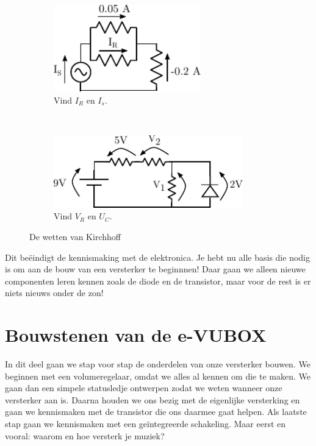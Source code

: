 \documentclass{article}
\begin{document}
			\begin{figure}[htbp]
				\centering
				\begin{subfigure}[b]{0.45\linewidth}
					\centering
					\includegraphics[width=0.7\textwidth]{kcl_oef.pdf}
					\caption{Vind $I_R$ en $I_s$.}
					\label{subfig:kcl_oef}
				\end{subfigure}
				~
				\begin{subfigure}[b]{0.45\linewidth}
					\centering
					\includegraphics[width=0.9\textwidth]{kvl_oef.pdf}
					\caption{Vind $V_R$ en $U_C$. }
					\label{subfig:kvl_oef}
				\end{subfigure}
			\caption{De wetten van Kirchhoff}
			\label{fig:kirchoff_oef}
			\end{figure}

			Dit be\"eindigt de kennismaking met de elektronica. Je hebt nu alle basis die nodig is om aan de bouw van een versterker te beginnnen! Daar gaan we alleen nieuwe componenten leren kennen zoals de diode en de transistor, maar voor de rest is er niets nieuws onder de zon!

	\section{Bouwstenen van de e-VUBOX}
	\label{sec:bouwstenen}
		In dit deel gaan we stap voor stap de onderdelen van onze versterker bouwen. We beginnen met een volumeregelaar, omdat we alles al kennen om die te maken. We gaan dan een simpele statusledje ontwerpen zodat we weten wanneer onze versterker aan is. Daarna houden we ons bezig met de eigenlijke versterking en gaan we kennismaken met de transistor die ons daarmee gaat helpen. 
		Als laatste stap gaan we kennismaken met een ge\"integreerde schakeling. Maar eerst en vooral: waarom en hoe versterk je muziek?
\end{document}
